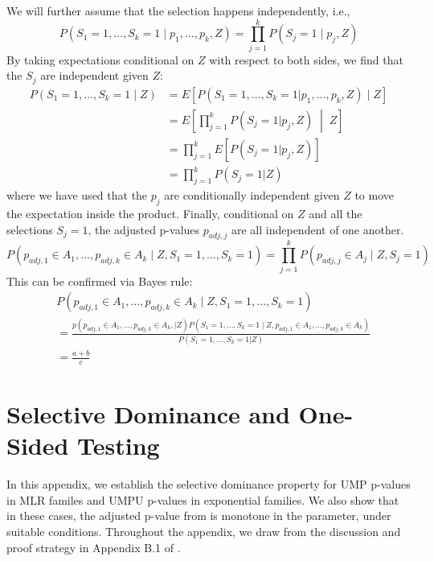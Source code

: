 \documentclass{article}
\begin{document}
\begin{appendix}
We will further assume that the selection happens independently, i.e., 
\begin{equation*}
    P(S_1 = 1, \dots, S_k = 1 \mid p_1, \dots, p_k, Z) = \prod_{j = 1}^k P(S_j = 1 \mid p_j, Z)
\end{equation*} 
By taking expectations conditional on $Z$ with respect to both sides, we find that the $S_j$ are independent given $Z$:
\begin{align*}
    P(S_1 = 1, \dots, S_k = 1 \mid Z) &= E[P(S_1 = 1, \dots, S_k = 1 | p_1, \dots, p_k, Z) \mid Z] \\
    &= E \left[\prod_{j = 1}^k P(S_j = 1 | p_j, Z) \;\middle|\; Z\right]\\
    &= \prod_{j=1}^k E[P(S_j = 1 | p_j, Z)]\\
    &= \prod_{j=1}^k P(S_j = 1 | Z)
\end{align*}
where we have used that the $p_j$ are conditionally independent given $Z$ to move the expectation inside the product. Finally, conditional on $Z$ and all the selections $S_j=1$, the adjusted p-values $p_{adj, j}$ are all independent of one another. 
\begin{equation*}
    P(p_{adj, 1} \in A_1, \dots, p_{adj, k} \in A_k \mid Z, S_1 = 1, \dots, S_k = 1) = \prod_{j=1}^k P(p_{adj, j} \in A_j \mid Z, S_j = 1)
\end{equation*}
This can be confirmed via Bayes rule:
\begin{align*}
    &P(p_{adj, 1} \in A_1, \dots, p_{adj, k} \in A_k \mid Z, S_1 = 1, \dots, S_k = 1) \\
    &= \frac{p(p_{adj, 1} \in A_1, \dots, p_{adj, k} \in A_k, | Z) P( S_1 = 1, \dots, S_k = 1 \mid Z, p_{adj, 1} \in A_1, \dots, p_{adj, k} \in A_k)  }{P(S_1=1, \dots, S_k = 1 | Z)}\\
    &= \frac{a + b}{c}
\end{align*}

\section{Selective Dominance and One-Sided Testing}

In this appendix, we establish the selective dominance property for UMP p-values in MLR familes and UMPU p-values in exponential families. We also show that in these cases, the adjusted p-value from  is monotone in the parameter, under suitable conditions. Throughout the appendix, we draw from the discussion and proof strategy in Appendix B.1 of \cite{Lei}.


\end{appendix}
\end{document}
